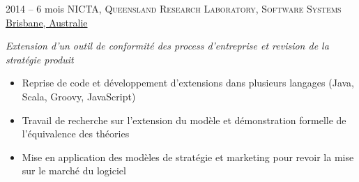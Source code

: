 \documentclass[]{friggeri-cv} %
\begin{document}
\begin{entrylist}
\entry
{2014 -- 6 mois}
{NICTA, \textsc{Queensland Research Laboratory, Software Systems}}
{\ul{Brisbane, Australie}}
{\emph{Extension d'un outil de conformité des process d'entreprise et revision de la stratégie produit}
\begin{itemize}
\item Reprise de code et développement d'extensions dans plusieurs langages (Java, Scala, Groovy, JavaScript)
\item Travail de recherche sur l'extension du modèle et démonstration formelle de l'équivalence des théories
\item Mise en application des modèles de stratégie et marketing pour revoir la mise sur le marché du logiciel
\end{itemize}
}


\end{entrylist}
\end{document}
